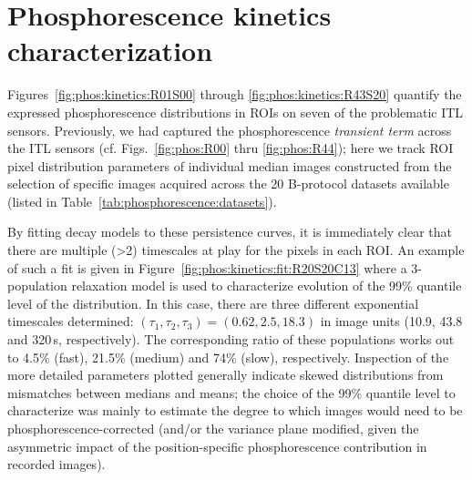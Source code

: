 \section{Phosphorescence kinetics characterization}
\label{appendix:phos:kinetics}

Figures~\ref{fig:phos:kinetics:R01S00} through \ref{fig:phos:kinetics:R43S20} quantify the expressed phosphorescence distributions in ROIs on seven of the problematic ITL sensors. Previously, we had captured the phosphorescence {\it transient term} across the ITL sensors (cf. Figs.~\ref{fig:phos:R00} thru \ref{fig:phos:R44}); here we track ROI pixel distribution parameters of individual median images constructed from the selection of specific images acquired across the 20 B-protocol datasets available (listed in Table~\ref{tab:phosphorescence:datasets}). 

By fitting decay models to these persistence curves, it is immediately clear that there are multiple (>2) timescales at play for the pixels in each ROI. An example of such a fit is given in Figure~\ref{fig:phos:kinetics:fit:R20S20C13} where a 3-population relaxation model is used to characterize evolution of the 99\% quantile level of the distribution. In this case, there are three different exponential timescales determined: $(\tau_1,\tau_2,\tau_3) = (0.62,2.5,18.3)$ in image units (10.9, 43.8 and 320\,s, respectively). The corresponding ratio of these populations works out to 4.5\% (fast), 21.5\% (medium) and 74\% (slow), respectively. Inspection of the more detailed parameters plotted generally indicate skewed distributions from mismatches between medians and means; the choice of the 99\% quantile level to characterize was mainly to estimate the degree to which images would need to be phosphorescence-corrected (and/or the variance plane modified, given the asymmetric impact of the position-specific phosphorescence contribution in recorded images). 

